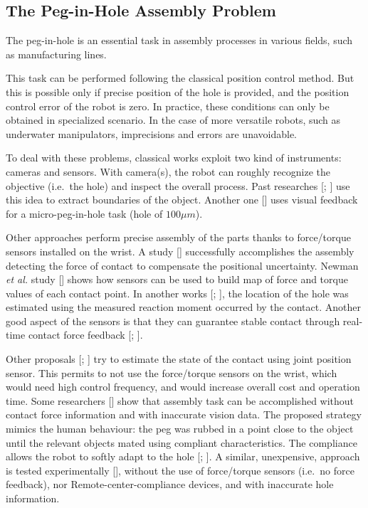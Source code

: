 \subsection{The Peg-in-Hole Assembly Problem}
\label{sec:artPeg}
The peg-in-hole is an essential task in assembly processes in various fields, such as manufacturing lines.

This task can be performed following the classical position control method. But this is possible only if precise position of the hole is provided, and the position control error of the robot is zero.
In practice, these conditions can only be obtained in specialized scenario. In the case of more versatile robots, such as underwater manipulators, 
imprecisions and errors are unavoidable.

To deal with these problems, classical works exploit two kind of instruments: cameras and sensors. 
With camera(s), the robot can roughly recognize the objective (i.e.\ the hole) and inspect the overall process. Past researches [\cite{IntroPeg2}; \cite{IntroPeg1}] use this idea to extract boundaries of the object. Another one [\cite{IntroPeg3}] uses visual feedback for a micro-peg-in-hole task (hole of $100 \mu m$).

Other approaches perform precise assembly of the parts thanks to force/torque sensors installed on the wrist. A study [\cite{IntroPeg4}] successfully accomplishes the assembly detecting the force of contact to compensate the positional uncertainty. Newman \textit{et al.} study [\cite{IntroPeg7}] shows how sensors can be used to build map of force and torque values of each contact point.  
In another works [\cite{IntroPeg9}; \cite{IntroPeg8}], the location of the hole was estimated using the measured reaction moment occurred by the contact.
Another good aspect of the sensors  is that they can guarantee stable contact through real-time contact force feedback [\cite{IntroPeg6}; \cite{IntroPeg5}].

Other proposals [\cite{IntroPeg10}; \cite{IntroPeg11}] try to estimate the state of the contact using joint position sensor. This permits to not use the force/torque sensors on the wrist, which would need high control frequency, and would increase overall cost and operation time. 
Some researchers [\cite{IntroPeg12}] show that assembly task can be accomplished without contact force information and with inaccurate vision data. The proposed strategy  mimics the human behaviour: the peg was rubbed in a point close to the object until the relevant objects mated using compliant characteristics. The compliance allows the robot to softly adapt to the hole [\cite{IntroPeg13}; \cite{IntroPeg14}].
A similar, unexpensive, approach is tested experimentally [\cite{IntroPeg15}], without the use of force/torque sensors (i.e.\ no force feedback), nor Remote-center-compliance devices, and with inaccurate hole information.




